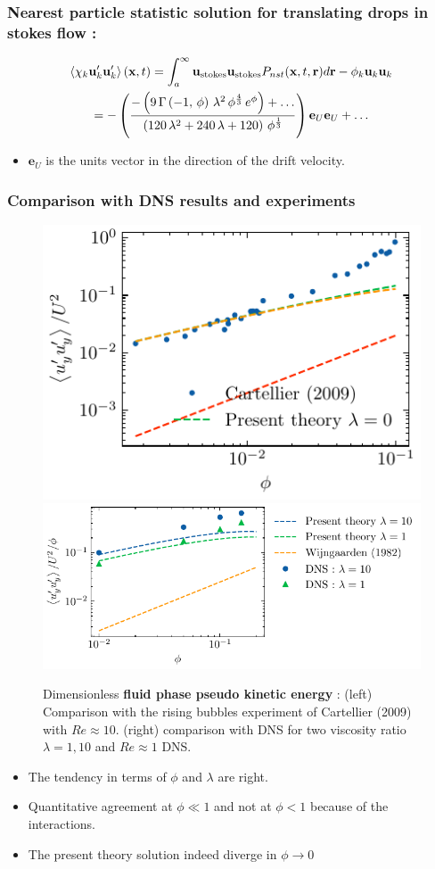 \documentclass{sintefbeamer}
\newcommand{\avg}[1]{\left<#1\right>}
\begin{document}
\begin{frame}
  \frametitle{Nearest particle statistic solution for translating drops in stokes flow :}
  \begin{multline}
    \avg{\chi_k \textbf{u}'_k\textbf{u}'_k}(\textbf{x},t)
    = 
    {\int_a^\infty \textbf{u}_\text{stokes} \textbf{u}_\text{stokes}  P_{nst}(\textbf{x},t,\textbf{r}) d\textbf{r} }
    - \phi_k \textbf{u}_k\textbf{u}_k
    \\=
-\left({{-\left(9\,\Gamma\left(-1 , \,\phi\right)\,\lambda^2\,\phi
^{{{4}\over{3}}}\,e^{\phi}\right)+\ldots}\over{\left(120\,\lambda^2+240\,\lambda+
120\right)\,\phi^{{{1}\over{3}}}}}\right)
\textbf{e}_U\textbf{e}_U + \ldots
\end{multline}
\begin{itemize}
  \item $\textbf{e}_U$ is the units vector in the direction of the drift velocity. 
\end{itemize}

\end{frame}

\begin{frame}
  \frametitle{Comparison with DNS results and experiments}
  \begin{figure}[h!]
    \centering    
    \includegraphics[height = 0.25\textwidth]{image/HOMOGENEOUS/fCA/cartellier.pdf}
    \includegraphics[height = 0.25\textwidth]{image/HOMOGENEOUS/fCA/Pseudo_turbe.pdf}
    \caption{
       Dimensionless \textbf{fluid phase pseudo kinetic energy} :
       (left) Comparison with the rising bubbles experiment of Cartellier (2009) with $Re \approx 10$. 
       (right) comparison with DNS for two viscosity ratio $\lambda =1,10$ and $Re \approx 1$ DNS. 
    }
    \label{fig:Cp}
\end{figure}  
\begin{itemize}
  \item The tendency in terms of $\phi$ and $\lambda$ are right.  
  \item Quantitative agreement at $\phi \ll 1$ and not at $\phi <1$ because of the interactions.  
  \item The present theory solution indeed diverge in $\phi \to 0$ 
\end{itemize}
\end{frame}
\end{document}
